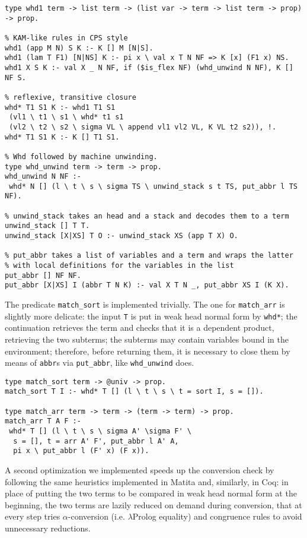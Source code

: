 \begin{Verbatim}
type whd1 term -> list term -> (list var -> term -> list term -> prop) -> prop.

% KAM-like rules in CPS style
whd1 (app M N) S K :- K [] M [N|S].
whd1 (lam T F1) [N|NS] K :- pi x \ val x T N NF => K [x] (F1 x) NS.
whd1 X S K :- val X _ N NF, if ($is_flex NF) (whd_unwind N NF), K [] NF S.

% reflexive, transitive closure
whd* T1 S1 K :- whd1 T1 S1
 (vl1 \ t1 \ s1 \ whd* t1 s1
 (vl2 \ t2 \ s2 \ sigma VL \ append vl1 vl2 VL, K VL t2 s2)), !.
whd* T1 S1 K :- K [] T1 S1.

% Whd followed by machine unwinding.
type whd_unwind term -> term -> prop.
whd_unwind N NF :-
 whd* N [] (l \ t \ s \ sigma TS \ unwind_stack s t TS, put_abbr l TS NF).

% unwind_stack takes an head and a stack and decodes them to a term
unwind_stack [] T T.
unwind_stack [X|XS] T O :- unwind_stack XS (app T X) O.

% put_abbr takes a list of variables and a term and wraps the latter
% with local definitions for the variables in the list
put_abbr [] NF NF.
put_abbr [X|XS] I (abbr T N K) :- val X T N _, put_abbr XS I (K X).
\end{Verbatim}

The predicate \verb+match_sort+ is implemented trivially. The one for \verb+match_arr+ is slightly more delicate: the input \verb+T+ is put in weak head normal form by \verb+whd*+; the continuation retrieves the term and checks that it is a dependent product, retrieving the two subterms; the subterms may contain variables bound in the environment; therefore, before returning them, it is necessary to close them by means of \verb+abbr+s via \verb+put_abbr+, like \verb+whd_unwind+ does.

\begin{Verbatim}
type match_sort term -> @univ -> prop.
match_sort T I :- whd* T [] (l \ t \ s \ t = sort I, s = []).

type match_arr term -> term -> (term -> term) -> prop.
match_arr T A F :-
 whd* T [] (l \ t \ s \ sigma A' \sigma F' \
  s = [], t = arr A' F', put_abbr l A' A,
  pi x \ put_abbr l (F' x) (F x)).
\end{Verbatim}

A second optimization we implemented speeds up the conversion check by following the same heuristics implemented in Matita and, similarly, in Coq: in place of putting the two terms to be compared in weak head normal form at the beginning, the two terms are lazily reduced on demand during conversion, that at every step tries $\alpha$-conversion (i.e. $\lambda$Prolog equality) and congruence rules to avoid unnecessary reductions.

